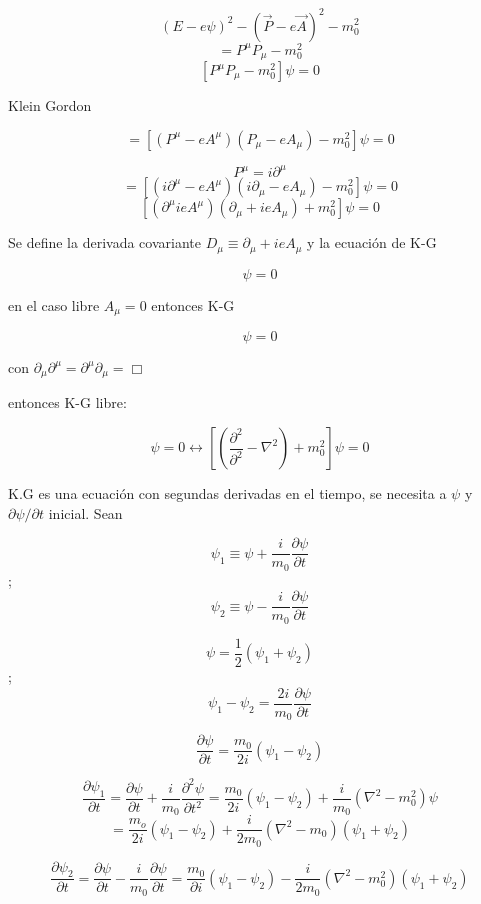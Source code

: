 \documentclass{report}
\begin{document}
\[(E - e \psi)^2 - (\overrightarrow{P}-e\overrightarrow{A})^2 - m_{0}^2\]
\[ = P^{\mu}P_{\mu}-m_{0}^2\]
\[ [P^{\mu} P_{\mu} - m_{0}^2 ]\psi = 0\]

Klein Gordon

\[= [(P^{\mu}-eA^{\mu})(P_{\mu}-eA_{\mu})-m_{0}^2]\psi = 0\]

\[P^{\mu} = i \partial^{\mu}\]
\[=[(i \partial ^{\mu} - eA^{\mu})(i \partial_{\mu} - eA_{\mu})-m_{0}^2]\psi = 0\]
\[[(\partial^{\mu}ieA^{\mu})(\partial_{\mu}+ieA_{\mu})+m_{0}^2]\psi = 0\]

Se define la derivada covariante $D_{\mu} \equiv \partial_{\mu} + ieA_{\mu}$ y la ecuación de K-G

\begin{equation}
[D^{\mu}D_{\mu}+m_{0}^2]\psi = 0
\end{equation}

en el caso libre $A_{\mu} = 0$ entonces K-G

\begin{equation}
[\partial^{\mu} \partial_{\mu}+m_{0}^2]\psi = 0
\end{equation}

con $\partial_{\mu} \partial^{\mu} = \partial^{\mu} \partial_{\mu} = \Box$

entonces K-G libre:

\begin{equation}
[\Box + m_{0}]\psi = 0 \longleftrightarrow [(\frac{\partial^2}{\partial^2}-\nabla^2)+m_{0}^2]\psi = 0
\end{equation}

K.G es una ecuación con segundas derivadas en el tiempo, se necesita a $\psi$ y $\partial\psi/\partial t$ inicial. Sean

\[\psi_1 \equiv \psi + \frac{i}{m_{0}} \frac{\partial \psi}{\partial t}\] ; \[\psi_2 \equiv \psi - \frac{i}{m_{0}} \frac{\partial \psi}{\partial t}\]

\[\psi = \frac{1}{2} (\psi_1 + \psi _2) \] ; \[\psi_1-\psi_2 = \frac{2i}{m_0} \frac{\partial \psi}{\partial t}\]

\[\frac{\partial \psi}{\partial t} = \frac{m_0}{2i}(\psi_1-\psi_2) \]

\[\frac{\partial\psi_1}{\partial t} = \frac{\partial \psi}{\partial t} + \frac{i}{m_{0}} \frac{\partial^2\psi}{\partial t^2} = \frac{m_{0}}{2i}(\psi _1 - \psi_2)+\frac{i}{m_{0}}(\nabla ^2 - m_{0}^2)\psi\]
\[= \frac{m_o}{2i} (\psi_1 - \psi _2) + \frac{i}{2m_0}(\nabla ^2 - m_0)(\psi_1 + \psi _2)\]

\[\frac{\partial \psi_2}{\partial t} = \frac{\partial \psi}{\partial t} - \frac{i}{m_0} \frac{\partial \psi }{\partial t} = \frac{m_0}{\partial i} (\psi _1 - \psi _2)- \frac{i}{2 m_0} (\nabla ^2 - m_0 ^2) (\psi _1 + \psi _2)\]
\end{document}
